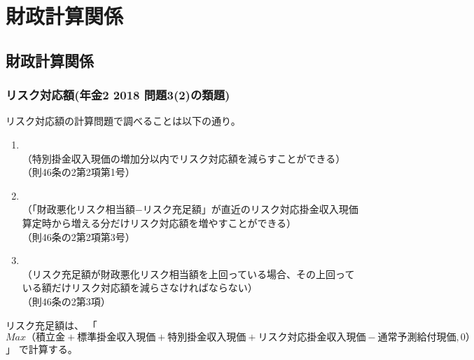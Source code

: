 \section{財政計算関係}

\subsection{財政計算関係}

\subsubsection{リスク対応額(年金2 2018 問題3(2)の類題)}


\begin{itembox}[l]{}
  
  リスク対応額の計算問題で調べることは以下の通り。

  \begin{enumerate}
    \item {}\\
    （特別掛金収入現価の増加分以内でリスク対応額を減らすことができる）\\
    （則46条の2第2項第1号）
    \item {}\\
    （「財政悪化リスク相当額$-$リスク充足額」が直近のリスク対応掛金収入現価算定時から増える分だけリスク対応額を増やすことができる）\\
    （則46条の2第2項第3号）
    \item {}\\
    （リスク充足額が財政悪化リスク相当額を上回っている場合、その上回っている額だけリスク対応額を減らさなければならない）\\
    （則46条の2第3項）
  \end{enumerate}



  リスク充足額は、
  「$Max
  （積立金 + 標準掛金収入現価+ 特別掛金収入現価+リスク対応掛金収入現価
  - 通常予測給付現価, 0）$」
  で計算する。

\end{itembox}

